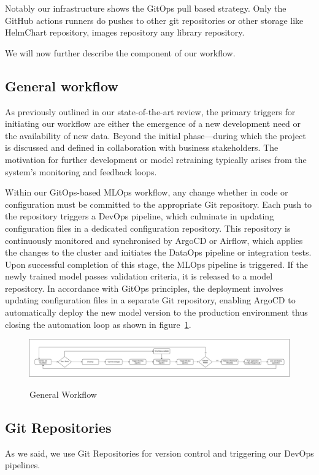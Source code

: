 Notably our infrastructure shows the GitOps pull based strategy.
Only the GitHub actions runners do pushes to other git repositories or other
storage like HelmChart repository, images repository any library repository.

We will now further describe the component of our workflow.

\subsection{General workflow}\label{subsec:general-development-workflow}
As previously outlined in our state-of-the-art review, the primary triggers for initiating our workflow are either
the emergence of a new development need or the availability of new data.
Beyond the initial phase—during which the project is discussed and defined in collaboration with business stakeholders.
The motivation for further development or model retraining typically arises from the system's monitoring and feedback loops.

Within our GitOps-based MLOps workflow, any change whether in code or configuration must be committed to the appropriate Git repository.
Each push to the repository triggers a DevOps pipeline, which culminate in updating configuration files in a dedicated configuration repository.
This repository is continuously monitored and synchronised by ArgoCD or Airflow, which applies the changes to the cluster and initiates the DataOps pipeline
or integration tests.
Upon successful completion of this stage, the MLOps pipeline is triggered.
If the newly trained model passes validation criteria, it is released to a model repository.
In accordance with GitOps principles, the deployment involves updating configuration files in a separate Git repository,
enabling ArgoCD to automatically deploy the new model version to the production environment thus closing the automation loop
as shown in figure~\ref{fig:general-workflow}.

\begin{figure}[!htbp]
    \centering
    \caption{General Workflow}
    \includegraphics[width=\linewidth]{images/project/general_workflow}
    \label{fig:general-workflow}
\end{figure}

\subsection{Git Repositories}\label{subsec:git-repositories}
As we said, we use Git Repositories for version control and triggering our DevOps pipelines.

